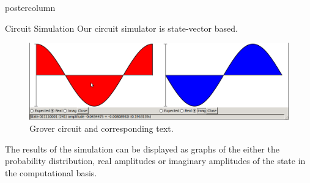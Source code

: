 \documentclass[final]{beamer} %
\begin{document}
\begin{frame}{}
\begin{columns}
        \begin{column}{.33\textwidth}
        \begin{beamercolorbox}[center,wd=\textwidth]{postercolumn}
        \begin{minipage}[T]{.95\textwidth}
            \begin{block}{\large Circuit Simulation}
                Our circuit simulator is state-vector based.
		        \begin{figure}[!htbp]
		            \centering
		            \includegraphics{figures/state.png}
		            \caption{Grover circuit and corresponding text.}
		        \end{figure}
                The results of the simulation can be displayed as graphs of the either the probability distribution, real amplitudes or imaginary amplitudes of the state in the computational basis.
		        \begin{figure}[!htbp]
		            \centering

\end{figure}
\end{block}
\end{minipage}
\end{beamercolorbox}
\end{column}
\end{columns}
\end{frame}
\end{document}
